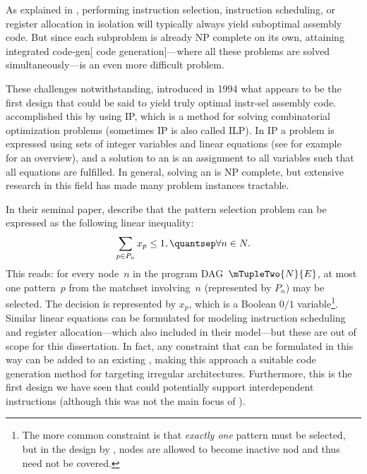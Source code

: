 As explained in , performing \gls{instruction
  selection}, \gls{instruction scheduling}, or \gls{register allocation} in
isolation will typically always yield suboptimal \gls{assembly code}.
%
But since
each subproblem is already \gls{NP complete} on its own, attaining
\gls{integrated code-gen}[ \gls{code generation}]---where all these problems
are solved simultaneously---is an even more difficult problem.

These challenges notwithstanding, \textcite{Wilson1994} introduced in 1994 what
appears to be the first design that could be said to yield truly \gls{optimal
  instr-sel} \gls{assembly code}.
%
\citeauthor{Wilson1994} accomplished this by
using \gls{IP}, which is a method for solving combinatorial optimization
problems (sometimes \gls{IP} is also called \gls{ILP}).
%
In \gls{IP} a problem is
expressed using sets of \glspl{integer variable} and linear equations (see for
example~\cite{Wolsey1998} for an overview), and a solution to an \tIPmodel is an
assignment to all variables such that all equations are fulfilled.
%
In general,
solving an \tIPmodel is \gls{NP complete}, but extensive research in this field
has made many problem instances tractable.

In their seminal paper, \citeauthor{Wilson1994} describe that the \gls{pattern
  selection} problem can be expressed as the following linear inequality:
%
\begin{displaymath}
  \sum_{p \in P_n} x_p \leq 1, \quantsep \forall n \in N.
\end{displaymath}
%
This reads: for every \gls{node}~$n$ in the \gls{program
  DAG}~\mbox{$\mTupleTwo{N}{E}$}, at most one \gls{pattern}~$p$ from the
\gls{matchset} involving~$n$ (represented by $P_n$) may be selected.
%
The
decision is represented by $x_p$, which is a Boolean \mbox{$0/1$}
variable\footnote{The more common constraint is that \emph{exactly one}
  \gls{pattern} must be selected, but in the design by \citeauthor{Wilson1994},
  \glspl{node} are allowed to become \gls{inactive nod} and thus need not be
  covered.}.
%
Similar linear equations can be formulated for modeling
\gls{instruction scheduling} and \gls{register allocation}---which
\citeauthor{Wilson1994} also included in their model---but these are out of
scope for this dissertation.
%
In fact, any constraint that can be formulated in this way
can be added to an existing \tIPmodel, making this approach a suitable \gls{code
  generation} method for targeting irregular architectures.
%
Furthermore, this is
the first design we have seen that could potentially support
\glspl{interdependent instruction} (although this was not the main focus of
\citeauthor{Wilson1994}).

